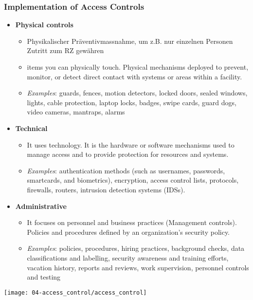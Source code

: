 \subsubsection{Implementation of Access Controls}
\begin{itemize}
    \item \textbf{Physical controls}
    \begin{itemize}
        \item Physikalischer Präventivmassnahme, um z.B. nur einzelnen Personen Zutritt zum RZ gewähren
        \item items you can physically touch. Physical mechanisms deployed to prevent, monitor, or detect direct contact with systems or areas within a facility.
        \item \textit{Examples}: guards, fences, motion detectors, locked doors, sealed windows, lights, cable protection, laptop locks, badges, swipe cards, guard dogs, video cameras, mantraps, alarms
    \end{itemize}
    \item \textbf{Technical}
    \begin{itemize}
        \item It uses technology. It is the hardware or software mechanisms used to manage access and to provide protection for resources and systems.
        \item \textit{Examples}: authentication methods (such as usernames, passwords, smartcards, and biometrics), encryption, access control lists, protocols, firewalls, routers, intrusion detection systems (IDSs).
    \end{itemize}
    \item \textbf{Administrative}
    \begin{itemize}
        \item It focuses on personnel and business practices (Management controls). Policies and procedures defined by an organization's security policy.
        \item \textit{Examples}: policies, procedures, hiring practices, background checks, data classifications and labelling, security awareness and training efforts, vacation history, reports and reviews, work supervision, personnel controls and testing
    \end{itemize}
\end{itemize}

\begin{center}
    \texttt{[image: 04-access\_control/access\_control]}
    \vspace{-8pt}
\end{center}


